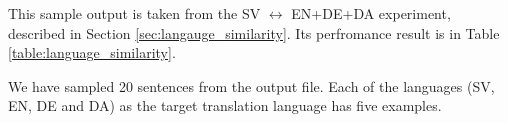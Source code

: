 \documentclass[thesis,fonts=libertine]{cluu}
\begin{document}
This sample output is taken from the SV $\leftrightarrow$ EN+DE+DA experiment, described in Section \ref{sec:langauge_similarity}. Its perfromance result is in Table \ref{table:language_similarity}.

We have sampled 20 sentences from the output file. Each of the languages (SV, EN, DE and DA) as the target translation language has five examples.



\printbibliography
\end{document}
